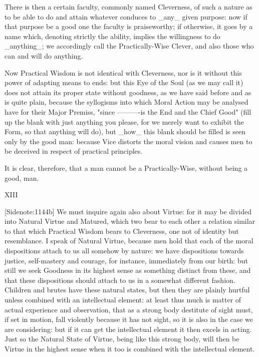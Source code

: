 There is then a certain faculty, commonly named Cleverness, of such a
nature as to be able to do and attain whatever conduces to _any_ given
purpose: now if that purpose be a good one the faculty is praiseworthy;
if otherwise, it goes by a name which, denoting strictly the ability,
implies the willingness to do _anything_; we accordingly call the
Practically-Wise Clever, and also those who can and will do anything.

Now Practical Wisdom is not identical with Cleverness, nor is it without
this power of adapting means to ends: but this Eye of the Soul (as we
may call it) does not attain its proper state without goodness, as we
have said before and as is quite plain, because the syllogisms into
which Moral Action may be analysed have for their Major Premiss, "since
----------is the End and the Chief Good" (fill up the blank with just
anything you please, for we merely want to exhibit the Form, so that
anything will do), but _how_ this blank should be filled is seen only by
the good man: because Vice distorts the moral vision and causes men to
be deceived in respect of practical principles.

It is clear, therefore, that a man cannot be a Practically-Wise,
without being a good, man.

XIII

[Sidenote:1144b] We must inquire again also about Virtue: for it may be
divided into Natural Virtue and Matured, which two bear to each other a
relation similar to that which Practical Wisdom bears to Cleverness, one
not of identity but resemblance. I speak of Natural Virtue, because men
hold that each of the moral dispositions attach to us all somehow by
nature: we have dispositions towards justice, self-mastery and courage,
for instance, immediately from our birth: but still we seek Goodness
in its highest sense as something distinct from these, and that these
dispositions should attach to us in a somewhat different fashion.
Children and brutes have these natural states, but then they are plainly
hurtful unless combined with an intellectual element: at least thus much
is matter of actual experience and observation, that as a strong body
destitute of sight must, if set in motion, fall violently because it has
not sight, so it is also in the case we are considering: but if it can
get the intellectual element it then excels in acting. Just so the
Natural State of Virtue, being like this strong body, will then
be Virtue in the highest sense when it too is combined with the
intellectual element.

